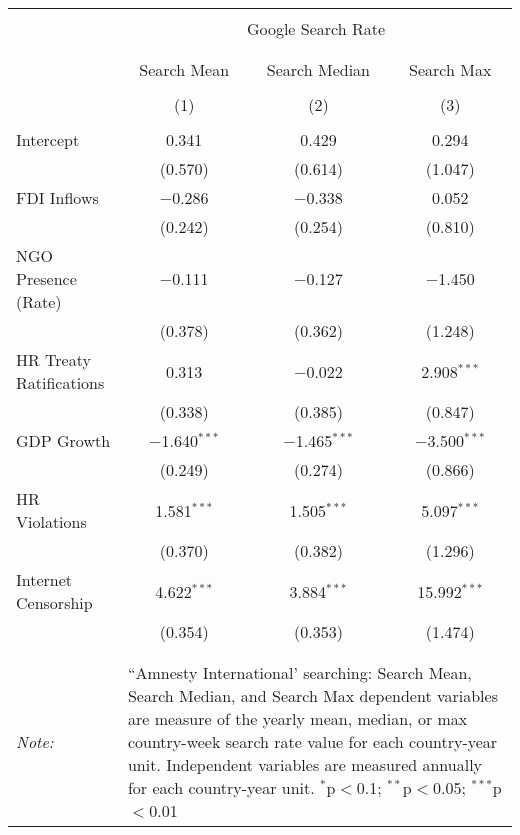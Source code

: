 
\begin{table}[!htbp] \centering 
  \caption{} 
  \label{} 
\begin{tabular}{@{\extracolsep{5pt}}lccc} 
\\[-1.8ex]\hline 
\hline \\[-1.8ex] 
 & \multicolumn{3}{c}{Google Search Rate} \\ 
\cline{2-4} 
\\[-1.8ex] & \multicolumn{3}{c}{ } \\ 
 & Search Mean & Search Median & Search Max \\ 
\\[-1.8ex] & (1) & (2) & (3)\\ 
\hline \\[-1.8ex] 
 Intercept & 0.341 & 0.429 & 0.294 \\ 
  & (0.570) & (0.614) & (1.047) \\ 
  FDI Inflows & $-$0.286 & $-$0.338 & 0.052 \\ 
  & (0.242) & (0.254) & (0.810) \\ 
  NGO Presence (Rate) & $-$0.111 & $-$0.127 & $-$1.450 \\ 
  & (0.378) & (0.362) & (1.248) \\ 
  HR Treaty Ratifications & 0.313 & $-$0.022 & 2.908$^{***}$ \\ 
  & (0.338) & (0.385) & (0.847) \\ 
  GDP Growth & $-$1.640$^{***}$ & $-$1.465$^{***}$ & $-$3.500$^{***}$ \\ 
  & (0.249) & (0.274) & (0.866) \\ 
  HR Violations & 1.581$^{***}$ & 1.505$^{***}$ & 5.097$^{***}$ \\ 
  & (0.370) & (0.382) & (1.296) \\ 
  Internet Censorship & 4.622$^{***}$ & 3.884$^{***}$ & 15.992$^{***}$ \\ 
  & (0.354) & (0.353) & (1.474) \\ 
 \hline \\[-1.8ex] 
\hline 
\hline \\[-1.8ex] 
\textit{Note:}  & \multicolumn{3}{l}{\parbox[t]{8cm}{``Amnesty International' searching: Search Mean, Search Median, and Search Max dependent variables are measure of the yearly mean, median, or max country-week search rate value for each country-year unit. Independent variables are measured annually for each country-year unit. $^{*}$p$<$0.1; $^{**}$p$<$0.05; $^{***}$p$<$0.01}} \\ 
\end{tabular} 
\end{table} 
